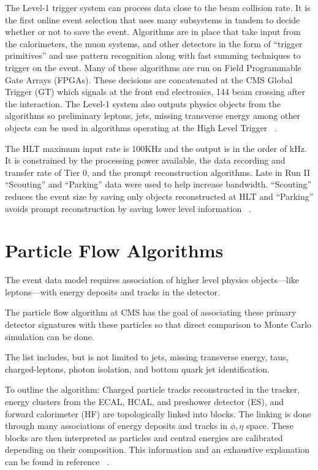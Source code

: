 The Level-1 trigger system can process data close to the beam collision rate. It is the first online event selection that uses many subsystems in tandem to decide whether or not to save the event. Algorithms are in place that take input from the calorimeters, the muon systems, and other detectors in the form of ``trigger primitives'' and use pattern recognition along with fast summing techniques to trigger on the event. Many of these algorithms are run on Field Programmable Gate Arrays (FPGAs). These decisions are concatenated at the CMS Global Trigger (GT) which signals at the front end electronics, 144 beam crossing after the interaction. The Level-1 system also outputs physics objects from the algorithms so preliminary leptons, jets, missing transverse energy among other objects can be used in algorithms operating at the High Level Trigger ~\cite{Foudas:2232067}. 


The HLT maximum input rate is 100KHz and the output is in the order of kHz. It is constrained by the processing power available, the data recording and transfer rate of Tier 0, and the prompt reconstruction algorithms. Late in Run II  ``Scouting'' and ``Parking'' data were used to help increase bandwidth. ``Scouting'' reduces the event size by saving only objects reconstructed at HLT and ``Parking'' avoids prompt reconstruction by saving lower level information ~\cite{Thomas:2703017}.


\section{Particle Flow Algorithms}
The event data model requires association of higher level physics objects---like leptons---with energy deposits and tracks in the detector. 

The particle flow algorithm at CMS has the goal of associating these primary detector signatures with these particles so that direct comparison to Monte Carlo simulation can be done. 

The list includes, but is not limited to jets, missing transverse energy, taus, charged-leptons, photon isolation, and bottom quark jet identification.


To outline the algorithm: Charged particle tracks reconstructed in the tracker, energy clusters from the ECAL, HCAL, and preshower detector (ES), and forward calorimeter (HF) are topologically linked into blocks. The linking is done through many associations of energy deposits and tracks in $\phi,\eta$ space. These blocks are then interpreted as particles and central energies are calibrated depending on their composition. This information and an exhaustive explanation can be found in reference ~\cite{CMS-PAS-PFT-10-001}.

